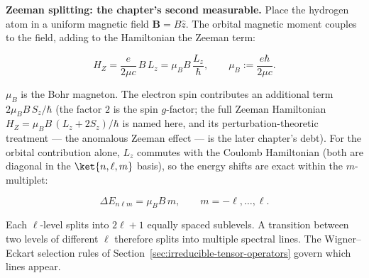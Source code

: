 \medskip\noindent\textbf{Zeeman splitting: the chapter's second measurable.} Place the hydrogen atom in a uniform magnetic field $\bm B = B\hat{z}$. The orbital magnetic moment couples to the field, adding to the Hamiltonian the Zeeman term:
\begin{linenomath}
\begin{equation}
H_Z = \frac{e}{2\mu c}\,B\,L_z = \mu_B B\,\frac{L_z}{\hbar},
\qquad
\mu_B := \frac{e\hbar}{2\mu c} .
\label{eq:zeeman-splitting}
\end{equation}
\end{linenomath}
$\mu_B$ is the Bohr magneton. The electron spin contributes an additional term $2\mu_B B\,S_z/\hbar$ (the factor $2$ is the spin $g$-factor; the full Zeeman Hamiltonian $H_Z = \mu_B B\,(L_z + 2S_z)/\hbar$ is named here, and its perturbation-theoretic treatment --- the anomalous Zeeman effect --- is the later chapter's debt). For the orbital contribution alone, $L_z$ commutes with the Coulomb Hamiltonian (both are diagonal in the $\ket{n,\ell,m}$ basis), so the energy shifts are exact within the $m$-multiplet:
\begin{linenomath}
\begin{equation}
\Delta E_{n\ell m} = \mu_B B\,m, \qquad m = -\ell,\ldots,\ell .
\end{equation}
\end{linenomath}
Each $\ell$-level splits into $2\ell+1$ equally spaced sublevels. A transition between two levels of different $\ell$ therefore splits into multiple spectral lines. The Wigner--Eckart selection rules of Section~\ref{sec:irreducible-tensor-operators} govern which lines appear.

